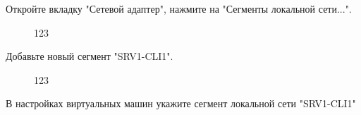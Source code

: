 \documentclass[a4paper, 12pt]{report}
\begin{document}
	\clearpage

	Откройте вкладку "Сетевой адаптер", нажмите на "Сегменты локальной сети...".

	\begin{figure}[h]
		\caption{123}
		\label{fig:image}
	\end{figure}

	\clearpage

	Добавьте новый сегмент "SRV1-CLI1".
	
	\begin{figure}[h]
		\caption{123}
		\label{fig:image}
	\end{figure}

	В настройках виртуальных машин укажите сегмент локальной сети "SRV1-CLI1"
	
\end{document}
